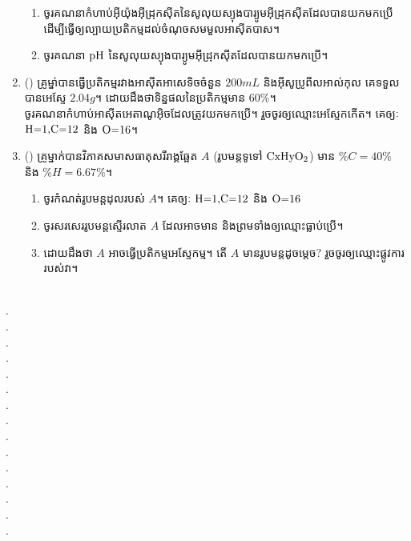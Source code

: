 \documentclass{officialexam}
\begin{document}
\begin{enumerate}[I]
	\begin{enumerate}[k]
		\item ចូរគណនាកំហាប់អុីយ៉ុងអុីដ្រុកសុីតនៃសូលុយស្យុងបា​រ្យូមអុីដ្រុកសុីតដែលបានយកមកប្រើដើម្បីធ្វើឲ្យល្បាយប្រតិកម្មដល់ចំណុចសមមួលអាសុីតបាស។
		\item ចូរគណនា $\ce{pH}$ នៃសូលុយស្យុងបា​រ្យូមអុីដ្រុកសុីតដែលបានយកមកប្រើ។
	\end{enumerate}
	\item  {\color{khtug}()} គ្រូម្នា់បានធ្វើប្រតិកម្មរវាងអាសុីតអាសេទិចចំនួន $200mL$ និងអុីសូប្រូពីលអាល់កុល គេទទួលបានអេស្ទែ $2.04g$។ ដោយដឹងថាទិន្នផលនៃប្រតិកម្មមាន $60\%$។\\
	ចូរគណនាកំហាប់អាសុីតអេតាណូអុិចដែលត្រូវយកមកប្រើ។ រួចចូរឲ្យឈ្មោះអេស្ទែកកើត។ គេឲ្យៈ $\ce{H=1, C=12}$ និង $\ce{O=16}$។
	\item {\color{khtug}()} គ្រូម្នាក់បានវិភាគសមាសធាតុសរីរាង្គឆ្អែត $A$ (រូបមន្តទូទៅ $\ce{CxHyO2}$) មាន $\%C=40\%$ និង $\%H=6.67\%$។
	\begin{enumerate}[k]
		\item ចូរកំណត់រូបមន្តដុលរបស់ $A$។ គេឲ្យៈ $\ce{H=1, C=12}$ និង $\ce{O=16}$
		\item ចូរសរសេររូបមន្តស្ទើរលាត $A$ ដែលអាចមាន និងព្រមទាំងឲ្យឈ្មោះធ្លាប់ប្រើ។
		\item ដោយដឹងថា $A$ អាចធ្វើប្រតិកម្មអេស្ទែកម្ម។ តើ $A$ មានរូបមន្តដូចម្តេច? រួចចូរឲ្យឈ្មោះផ្លូវការរបស់វា។
	\end{enumerate}
\end{enumerate}\newpage
{}\\
{\color{white}.}\dotfill\\
{\color{white}.}\dotfill\\
{\color{white}.}\dotfill
\\
{\color{white}.}\dotfill\\
{\color{white}.}\dotfill\\
{\color{white}.}\dotfill
\\
{\color{white}.}\dotfill\\
{\color{white}.}\dotfill\\
{\color{white}.}\dotfill
\\
{\color{white}.}\dotfill\\
{\color{white}.}\dotfill\\
{\color{white}.}\dotfill
\\
{\color{white}.}\dotfill\\
{\color{white}.}\dotfill\\
{\color{white}.}\dotfill
\\
\end{document}
